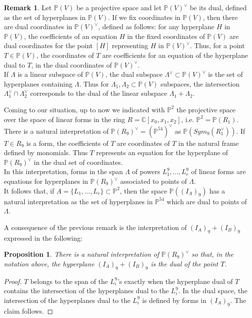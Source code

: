 \documentclass{amsart}
\newcommand{\C}{\mathbb{C}}
\newcommand{\Pj}{\mathbb{P}}
\newtheorem{prop0}[thm0]{Proposition}
\theoremstyle{definition}
\newtheorem{rem0}[thm0]{Remark}
\begin{document}
\begin{rem0}\label{rem:dualnotation} Let $\Pj(V)$ be a projective space and let $\Pj(V)^\vee$ be its dual, defined as the set of hyperplanes in $\Pj(V)$.
 If we fix coordinates in $\Pj(V)$, then there are dual coordinates in $\Pj(V)^\vee$, defined as follows:
for  any  hyperplane $H$ in $\Pj(V)$, the coefficients of an equation $H$ in the fixed coordinates of $\Pj(V)$ are dual coordinates for the point $[H]$ representing $H$ 
in $\Pj(V)^\vee$. Thus, for a point $T\in\Pj(V)$, the coordinates of $T$ are coefficients for an equation of the hyperplane dual to $T$, in the
dual coordinates of $\Pj(V)^\vee$.\\
If $\Lambda$ is a linear subspace of $\Pj(V)$, the dual subspace $\Lambda^\vee\subset\Pj(V)^\vee$ is the set of hyperplanes containing $\Lambda$.
Thus for $\Lambda_1,\Lambda_2\subset\Pj(V)$ subspaces, the intersection $\Lambda_1^\vee\cap\Lambda_2^\vee$ corresponds to the dual of the linear subspace 
$\Lambda_1+\Lambda_2$.

Coming to our situation, up to now we indicated with $\Pj^2$ the projective space over the space of linear forms in the ring $R=\C[x_0,x_1,x_2]$,
i.e. $\Pj^2=\Pj(R_1)$. There is a  natural interpretation of $\Pj(R_9)^\vee=(\Pj^{54})^\vee$ as $\Pj(Sym_9(R_1^\vee))$.
If $T\in R_9$ is a form, the coefficients of $T$ are coordinates of $T$ in the natural frame defined  by monomials. Thus $T$
represents an equation for the hyperplane of $\Pj(R_9)^\vee$ in the dual set of coordinates.\\
In this interpretation, forms in the span $\Lambda$ of powers $L_1^9,\dots, L_r^9$ of linear forms are equations for hyperplanes in 
$\Pj(R_9)^\vee$ associated to points of $\Lambda$. \\
It follows that, if $A=\{L_1,\dots, L_r\}\subset\Pj^2$, then the space $\Pj((I_A)_9)$ has a natural interpretation as the set of hyperplanes
in $\Pj^{54}$ which are dual to points of $\Lambda$.
\end{rem0} 

A consequence of the previous remark is the interpretation of $ (I_A)_9+ (I_B)_9$ expressed in the following:

\begin{prop0}\label{dualsum} There is a natural interpretation of $\Pj(R_9)^\vee$ so that, in the notation above, the hyperplane $ (I_A)_9+ (I_B)_9$
is the dual of the point $T$.
\end{prop0}
\begin{proof} $T$ belongs to the span of the $L_i^9$'s exactly when the hyperplane dual of $T$ contains the intersection of the
hyperplanes dual to the $L_i^9$. In the dual space, the intersection of the
hyperplanes dual to the $L_i^9$ is defined by forms in $ (I_A)_9$. The claim follows.
\end{proof}
\end{document}
